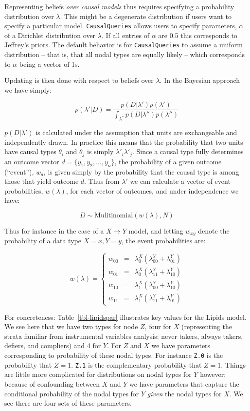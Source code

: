 \documentclass[
  11pt,
  article]{jss}
\begin{document}
Representing beliefs \emph{over causal models} thus requires specifying
a probability distribution over \(\lambda\). This might be a degenerate
distribution if users want to specify a particular model.
\texttt{CausalQueries} allows users to specify parameters, \(\alpha\) of
a Dirichlet distribution over \(\lambda\). If all entries of \(\alpha\)
are 0.5 this corresponds to Jeffrey's priors. The default behavior is
for \texttt{CausalQueries} to assume a uniform distribution -- that is,
that all nodal types are equally likely -- which corresponds to
\(\alpha\) being a vector of 1s.

Updating is then done with respect to beliefs over \(\lambda\). In the
Bayesian approach we have simply:

\[p(\lambda'|D) = \frac{p(D|\lambda')p(\lambda')}{\int_{\lambda^{''}} p(D|\lambda'')p(\lambda'')}\]

\(p(D|\lambda')\) is calculated under the assumption that units are
exchangeable and independently drawn. In practice this means that the
probability that two units have causal types \(\theta_i\) and
\(\theta_j\) is simply \(\lambda'_i\lambda'_j\). Since a causal type
fully determines an outcome vector \(d = \{y_1, y_2,\dots,y_n\}\), the
probability of a given outcome (``event''), \(w_d\), is given simply by
the probability that the causal type is among those that yield outcome
\(d\). Thus from \(\lambda'\) we can calculate a vector of event
probabilities, \(w(\lambda)\), for each vector of outcomes, and under
independence we have:

\[D \sim \text{Mulitinomial}(w(\lambda), N)\]

Thus for instance in the case of a \(X \rightarrow Y\) model, and
letting \(w_{xy}\) denote the probability of a data type \(X=x, Y=y\),
the event probabilities are:

\[w(\lambda) = \left\{\begin{array}{ccc} w_{00} & = & \lambda^X_0(\lambda^Y_{00} + \lambda^Y_{01})\\ 
w_{01} & = & \lambda^X_0(\lambda^Y_{11} + \lambda^Y_{10})\\
w_{10} & = & \lambda^X_1(\lambda^Y_{00} + \lambda^Y_{10})\\
w_{11} & = & \lambda^X_1(\lambda^Y_{11} + \lambda^Y_{01})\end{array} \right.\]

For concreteness: Table~\ref{tbl-lipidspar} illustrates key values for
the Lipids model. We see here that we have two types for node \(Z\),
four for \(X\) (representing the strata familiar from instrumental
variables analysis: never takers, always takers, defiers, and compliers)
and 4 for \(Y\). For \(Z\) and \(X\) we have parameters corresponding to
probability of these nodal types. For instance \texttt{Z.0} is the
probability that \(Z=1\). \texttt{Z.1} is the complementary probability
that \(Z=1\). Things are little more complicated for distributions on
nodal types for \(Y\) however: because of confounding between \(X\) and
\(Y\) we have parameters that capture the conditional probability of the
nodal types for \(Y\) \emph{given} the nodal types for \(X\). We see
there are four sets of these parameters.
\end{document}

